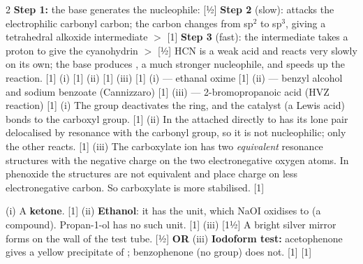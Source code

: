 \documentclass[10pt,a4paper]{extarticle}
\newcommand{\mk}[1]{{\scriptsize\color{black!55}[#1]}}
\begin{document}
\begin{multicols}{2}
\An \textbf{Step 1:} the base generates the nucleophile:  \mk{½}\nl
\textbf{Step 2} (slow):  attacks the electrophilic carbonyl carbon; the carbon changes from sp$^2$ to sp$^3$, giving a tetrahedral alkoxide intermediate $>$ \mk{1}\nl
\textbf{Step 3} (fast): the intermediate takes a proton to give the cyanohydrin $>$ \mk{½}\nl
HCN is a weak acid and reacts very slowly on its own; the base produces , a much stronger nucleophile, and speeds up the reaction. \mk{1}
\An (i)  \mk{1}\nl
(ii)  \mk{1}\nl
(iii)  \mk{1}
\An (i)  — ethanal oxime \mk{1}\nl
(ii)  — benzyl alcohol and sodium benzoate (Cannizzaro) \mk{1}\nl
(iii)  — 2-bromopropanoic acid (HVZ reaction) \mk{1}
\An (i) The  group deactivates the ring, and the catalyst  (a Lewis acid) bonds to the carboxyl group. \mk{1}\nl
(ii) In  the  attached directly to  has its lone pair delocalised by resonance with the carbonyl group, so it is not nucleophilic; only the other  reacts. \mk{1}\nl
(iii) The carboxylate ion has two \emph{equivalent} resonance structures with the negative charge on the two electronegative oxygen atoms. In phenoxide the structures are not equivalent and place charge on less electronegative carbon. So carboxylate is more stabilised. \mk{1}

\An (i) A \textbf{ketone}. \mk{1}\nl
(ii) \textbf{Ethanol}: it has the  unit, which NaOI oxidises to  (a  compound). Propan-1-ol has no such unit. \mk{1}\nl
(iii)   \mk{1½}\nl
A bright silver mirror forms on the wall of the test tube. \mk{½}\nl
\textbf{OR} (iii) \textbf{Iodoform test:} acetophenone gives a yellow precipitate of ; benzophenone (no  group) does not. \mk{1}\nl
{} \mk{1}


\end{multicols}
\end{document}
